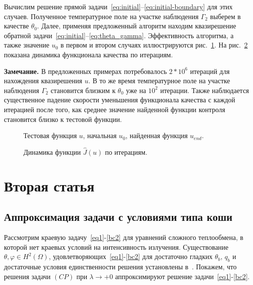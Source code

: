 Вычислим решение прямой задачи~\eqref{eq:initial}--\eqref{eq:initial-boundary} для этих случаев.
Полученное температурное поле на участке наблюдения $\Gamma_2$ выберем в качестве $\theta_0$.
Далее, применяя предложенный алгоритм находим квазирешение
обратной задачи~\eqref{eq:initial}--\eqref{eq:theta_gamma}.
Эффективность алгоритма, а также значение $u_0$ в первом и
втором случаях иллюстрируются рис.~\ref{fig:control}.
На рис.~\ref{fig:cost} показана динамика функционала качества по итерациям.

\textbf{Замечание.} В предложенных примерах потребовалось $2*10^6$ итераций для нахождения квазирешения $u$.
В то же время температурное поле на участке наблюдения $\Gamma_2$ становится близким
к $\theta_0$ уже на $10^2$ итерации.
Также наблюдается существенное падение скорости уменьшения функционала качества с
каждой итерацией после того, как среднее значение найденной функции контроля
становится близко к тестовой функции.
\begin{figure}[H]
    \centering
    \caption{Тестовая функция $u$, начальная $u_0$, найденная функция $u_{end}.$}
    \label{fig:control}
\end{figure}

\begin{figure}[H]
    \centering
    \caption{Динамика функции $\hat{J}(u)$ по итерациям.}
    \label{fig:cost}
\end{figure}

\clearpage


\section{Вторая статья}\label{sec:ch3/sec2}
\subsection{Аппроксимация задачи с условиями типа коши}\label{subsec:ch3/3_1}
Рассмотрим краевую задачу~\eqref{eq1}-\eqref{bc2} для уравнений сложного теплообмена, в которой нет краевых условий на
интенсивность излучения.
Существование $\theta,\varphi\in H^2(\Omega)$, удовлетворяющих~\eqref{eq1}-\eqref{bc2}
для достаточно гладких
$\theta_b,\, q_b$ и достаточные условия единственности решения
установлены в~\cite{CMMP20}.
Покажем, что решения задачи $(CP)$ при $\lambda\to+0$
аппроксимируют решение задачи~\eqref{eq1}-\eqref{bc2}.


